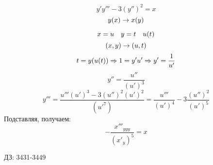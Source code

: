 \documentclass[main]{subfiles}
\begin{document}
  \begin{Example}
    \[y' y''' - 3(y'')^2 = x\]
    \[y(x) \rightarrow x(y)\]
  \end{Example}

  \begin{Sol}
    \[x = u \quad y = t \quad u(t)\]
    \[(x,y) \rightarrow (u,t)\]
    \[t = y(u(t)) \Rightarrow 1 = y' u' \Rightarrow y' = \dfrac{1}{u'}\]
    \[y'' = \dfrac{u''}{(u')^3}\]
    \[y''' = \dfrac{u''' (u')^3 - 3 (u'')^2 (u')^2}{(u'^7)} = \dfrac{u'''}{(u')^4} - 3 \dfrac{(u'')^2}{(u')^5}\]
    Подставляя, получаем:
    \[-\dfrac{x'''_{yyy}}{(x'_y)^5} = x\]
  \end{Sol}

  ДЗ: 3431-3449
\end{document}

